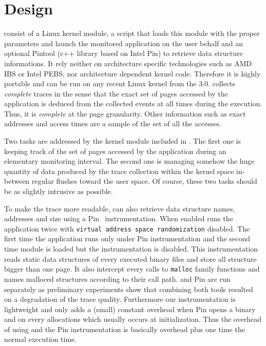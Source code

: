 \section{Design}
\label{sec:design}

\Moca consist of a Linux kernel module, a script that loads this module with
the proper parameters and launch the monitored application on the user behalf
and an optional Pintool (c++ library based on Intel Pin) to retrieve data
structure informations.
It rely neither on architecture specific
technologies such as AMD IBS or Intel PEBS, nor architecture dependent kernel
code. Therefore it is highly portable and can be run on any recent Linux kernel
from the $3.0$. \Moca collects \emph{complete} traces in the sense that the exact set
of pages accessed by the application is deduced from the collected events
at all times during the execution. Thus, it is \emph{complete} at the page granularity.
Other information such as exact addresses and access times are a sample of
the set of all the accesses.

Two tasks are addressed by the kernel module included in \Moca. The first one is
keeping track of the set of pages accessed by the application during an elementary monitoring
interval. The second one is managing somehow the huge quantity of data produced
by the trace collection within the kernel space in-between regular flushes toward
the user space. Of course, these two tasks should be as slightly intrusive as possible.

To make the trace more readable, \Moca can also retrieve data structure
names, addresses and size using a Pin~\cite{Luk05Pin}
instrumentation. When enabled \Moca runs the application twice with \texttt{virtual
address space randomization} disabled. The first time the application runs only
under Pin instrumentation and the second time \Moca module is loaded but the
instrumentation is disabled. This instrumentation reads static data
structures of every executed binary files and store all structure bigger than
one page. It also intercept every calls to \texttt{malloc} family functions
and names malloced structures according to their call path.
\Moca and Pin are run separately as preliminary experiments show that combining both
tools resulted on a degradation of the trace quality. Furthermore our
instrumentation is lightweight and only  adds a (small) constant overhead when
Pin opens a binary and on every allocations which usually occurs at
initialization. Thus the overhead of using \Moca and the Pin instrumentation
is basically \Moca overhead plus one time the normal execution time.


